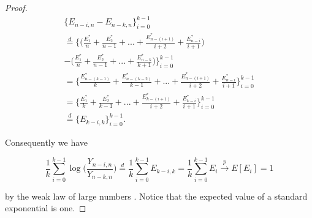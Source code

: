 \documentclass[english,12pt,a4paper,pdftex,sci,utf8]{aaltothesis} %
\begin{document}
\begin{proof}
\begin{equation*}
\begin{split}
\big\{E_{n-i,n} - E_{n-k,n}\big\}_{i=0}^{k-1} \\ 
\overset{d}{=} \bigg\{\Big( \frac{E_1^*}{n} + \frac{E_2^*}{n-1}+...+ \frac{E_{n-(i+1)}^*}{i+2} + \frac{E_{n-i}^*}{i+1} \Big) \\
- \Big(\frac{E_1^*}{n} + \frac{E_2^*}{n-1}+...+\frac{E_{n-k}^*}{k+1}\Big)\bigg\}_{i=0}^{k-1} \\
= \bigg\{ \frac{E_{n-(k-1)}^*}{k} + \frac{E_{n-(k-2)}^*}{k-1}+...+  \frac{E_{n-(i+1)}^*}{i+2} + \frac{E_{n-i}^*}{i+1} \bigg\}_{i=0}^{k-1} \\
= \bigg\{ \frac{E_1^*}{k} + \frac{E_2^*}{k-1}+...+\frac{E_{k-(i+1)}^*}{i+2} + \frac{E_{k-i}^*}{i+1} \bigg\}_{i=0}^{k-1}   \\
\overset{d}{=} \big\{E_{k-i,k}\big\}_{i=0}^{k-1}.
\end{split}
\end{equation*}

Consequently we have

\begin{equation*}
\frac{1}{k} \sum_{i=0}^{k-1} \log\Big(\frac{Y_{n-i,n}}{Y_{n-k,n}}\Big) \overset{d}{=} \frac{1}{k} \sum_{i=0}^{k-1} E_{k-i,k} = \frac{1}{k} \sum_{i=0}^{k-1} E_i \xrightarrow{p} E[E_i] = 1
\end{equation*}

by the weak law of large numbers \cite{rosenthal}. Notice that the expected value of a standard exponential is one.



\end{proof}
\end{document}
